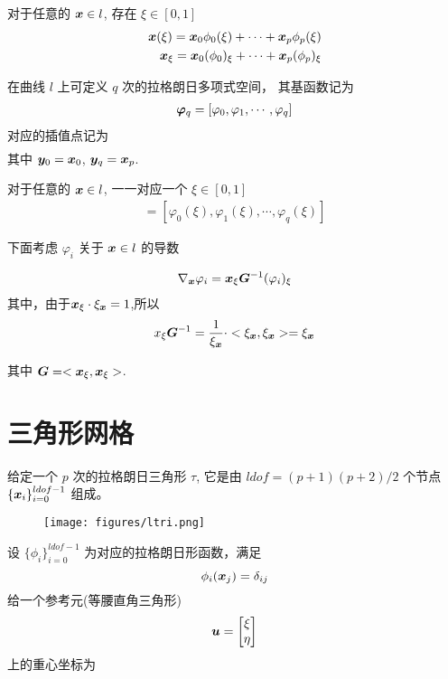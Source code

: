 \documentclass{article}
\begin{document}
对于任意的 ${\boldsymbol x} \in l$, 存在 $\xi \in [0, 1]$
\begin{align*}
    {\boldsymbol x}(\xi) = {\boldsymbol x}_0 \phi_0(\xi) + \cdots + {\boldsymbol x}_p\phi_p(\xi)\\
    {\boldsymbol x}_\xi = {\boldsymbol x}_0 (\phi_0)_\xi + \cdots + {\boldsymbol x}_p(\phi_p)_\xi
\end{align*}

在曲线 $l$ 上可定义 $q$ 次的拉格朗日多项式空间， 其基函数记为
\begin{align*}
    {\bm \varphi}_q = [\varphi_0, \varphi_1, \cdots, \varphi_q]
\end{align*}
对应的插值点记为
\begin{align*}
    [\bfy_0, \bfy_1, \cdots, \bfy_q]
\end{align*}
其中 ${\boldsymbol y}_0 = {\boldsymbol x}_0$, ${\boldsymbol y}_q = {\boldsymbol x}_p$.

对于任意的 ${\boldsymbol x} \in l$, 一一对应一个 $\xi \in [0, 1]$
\begin{align*}
    [\varphi_0(\bfx), \varphi_1(\bfx), \cdots, \varphi_q(\bfx)] = 
    [\varphi_0(\xi), \varphi_1(\xi), \cdots, \varphi_q(\xi)] 
\end{align*}

下面考虑 $\varphi_i$ 关于 ${\boldsymbol x} \in l$ 的导数

\begin{align*}
    \nabla_{\boldsymbol x} \varphi_i = {\boldsymbol x}_\xi {\boldsymbol G}^{-1} (\varphi_i)_\xi
\end{align*}
其中，由于${\boldsymbol x}_{\xi} \cdot \xi_{{\boldsymbol x}} = 1$,所以
\begin{align*}
	x_{\xi}{\boldsymbol G}^{-1} = \frac{1}{\xi_{\boldsymbol x}} \cdot <\xi_{\boldsymbol x}, \xi_{\boldsymbol x}> = \xi_{\boldsymbol x}
\end{align*}

其中 ${\boldsymbol G} = <{\boldsymbol x}_\xi, {\boldsymbol x}_\xi>$.





\section{三角形网格}
给定一个 $p$ 次的拉格朗日三角形 $\tau$, 它是由 $ldof = (p+1)(p+2)/2$ 个节点
$\{{\boldsymbol x}_i\}_{i=0}^{ldof-1}$ 组成。

\begin{figure}[H]
\texttt{[image: figures/ltri.png]}
\end{figure}


设 $\{\phi_i\}_{i=0}^{ldof-1}$ 为对应的拉格朗日形函数，满足 
$$
\phi_i({\boldsymbol x}_j) = \delta_{ij}
$$
给一个参考元(等腰直角三角形)
\begin{align*}
    {\boldsymbol u} = 
    \begin{bmatrix}
        \xi \\ \eta
    \end{bmatrix}
\end{align*}
上的重心坐标为
\end{document}
